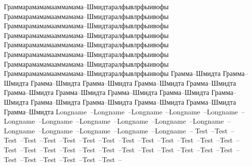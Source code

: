\documentclass{article}
\begin{document}
Граммарамамамааммамама--Шмидтаралфывлрфыивофы Граммарамамамааммамама--Шмидтаралфывлрфыивофы Граммарамамамааммамама--Шмидтаралфывлрфыивофы Граммарамамамааммамама--Шмидтаралфывлрфыивофы Граммарамамамааммамама--Шмидтаралфывлрфыивофы Граммарамамамааммамама--Шмидтаралфывлрфыивофы Граммарамамамааммамама--Шмидтаралфывлрфыивофы Граммарамамамааммамама--Шмидтаралфывлрфыивофы 
Грамма--Шмидта Грамма--Шмидта Грамма--Шмидта Грамма--Шмидта Грамма--Шмидта Грамма--Шмидта Грамма--Шмидта Грамма--Шмидта Грамма--Шмидта Грамма--Шмидта Грамма--Шмидта Грамма--Шмидта Грамма--Шмидта Грамма--Шмидта Грамма--Шмидта Грамма--Шмидта 
Longname~--Longname~--Longname~--Longname~--Longname~--Longname~--Longname~--Longname~--Longname~--Longname~--Longname~--Longname~--Longname~--Longname~--Longname~--Longname~--
Test~--Test~--Test~--Test~--Test~--Test~--Test~--Test~--Test~--Test~--Test~--Test~--Test~--Test~--Test~--Test~--Test~--Test~--Test~--Test~--Test~--Test~--Test~--Test~--Test~--Test~--Test~--Test~--Test~--Test~--Test~--Test~--
\end{document}
